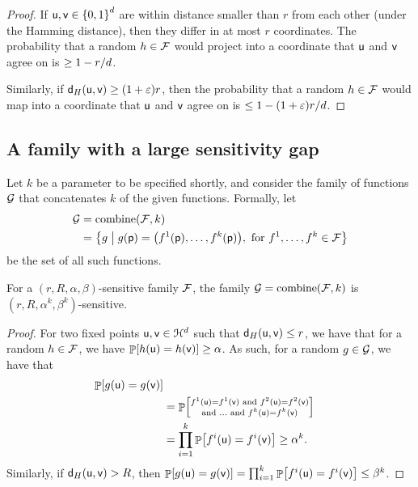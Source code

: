\begin{proof}
    If $\mathsf{u},\mathsf{v} \in \left\{ {0,1} \right\}^d$ are within distance smaller
    than $r$ from each other (under the Hamming distance), then they
    differ in at most $r$ coordinates. The probability that a random
    $h \in \mathcal{F}$ would project into a coordinate that $\mathsf{u}$ and
    $\mathsf{v}$ agree on is $\geq 1-r/d$.

    Similarly, if $\distH{\pntA}{\pntB} \geq (1+\eps)r$, then the
    probability that a random $h\in \mathcal{F}$ would map into a
    coordinate that $\mathsf{u}$ and $\mathsf{v}$ agree on is $\leq 1 -
    (1+{\varepsilon})r/d$.
\end{proof}

\subsection{A family with a large sensitivity gap}

Let $k$ be a parameter to be specified shortly, and consider the
family of functions $\mathcal{G}$ that concatenates $k$ of the given
functions. Formally, let
\begin{align*}
  \FamilyB%
  &=%
  \kFunctions{\Family}{k}%
  \\&=%
  \Set{ g }{ g(\pnt) = \bigl(f^1(\pnt),
  \ldots, f^k(\pnt)\bigr), \text{ for } f^1, \ldots, f^k \in
  \Family}
\end{align*}
be the set of all such functions.

\begin{lemma}
    For a $(r, R, \alpha, \beta)$-sensitive family $\mathcal{F}$, the
    family $\FamilyB = \kFunctions{\Family}{k}$ is
    $(r, R, \alpha^k, \beta^k)$-sensitive.
\end{lemma}

\begin{proof}
    For two fixed points $\mathsf{u}, \mathsf{v} \in \EuScript{H}^d$ such that
    $\distH{\pntA}{\pntB} \leq r$, we have that for a random $h \in
    \mathcal{F}$, we have $\Prob{h(\pntA) = h(\pntB) } \geq \alpha$. As
    such, for a random $g \in \mathcal{G}$, we have that
    \begin{align*}
        \Prob{ \MakesBig g(\pntA) = g(\pntB) }%
        \\
        &=%
        \Prob{ \substack{ f^1(\pntA) = f^1(\pntB) \text{ and } f^2(\pntA)%
           = f^2(\pntB) \\ \text{and } \ldots \text{ and } f^k(\pntA) =
           f^k(\pntB)}}%
        \\
        &=%
        \prod_{i=1}^k \Prob{f^i(\pntA) = f^i(\pntB)} \geq \alpha^k.
    \end{align*}
    Similarly, if $\distH{\pntA}{\pntB} > R$, then $\Prob{\MakesBig
       g(\pntA) = g(\pntB) } = \prod_{i=1}^k \Prob{f^i(\pntA) =
       f^i(\pntB)} \leq \beta^k$.
\end{proof}

